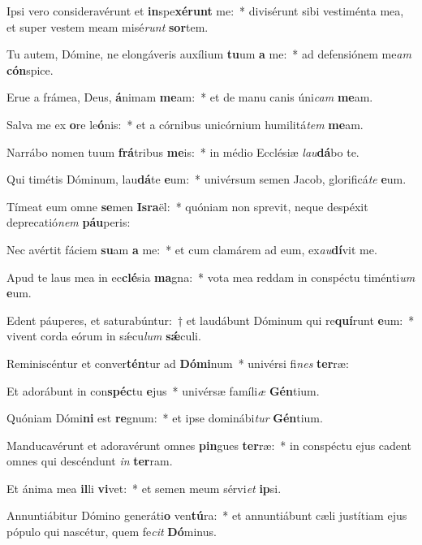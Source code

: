 \item Ipsi vero consideravérunt et \textbf{in}spe\textbf{xé}\textbf{runt} me:~* divisérunt sibi vestiménta mea, et super vestem meam misé\textit{runt} \textbf{sor}tem.
\item Tu autem, Dómine, ne elongáveris auxílium \textbf{tu}um \textbf{a} me:~* ad defensiónem me\textit{am} \textbf{cón}spice.
\item Erue a frámea, Deus, \textbf{á}nimam \textbf{me}am:~* et de manu canis úni\textit{cam} \textbf{me}am.
\item Salva me ex \textbf{o}re le\textbf{ó}nis:~* et a córnibus unicórnium humilitá\textit{tem} \textbf{me}am.
\item Narrábo nomen tuum \textbf{frá}tribus \textbf{me}is:~* in médio Ecclésiæ \textit{lau}\textbf{dá}bo te.
\item Qui timétis Dóminum, lau\textbf{dá}te \textbf{e}um:~* univérsum semen Jacob, glorificá\textit{te} \textbf{e}um.
\item Tímeat eum omne \textbf{se}men \textbf{Is}\textbf{ra}ël:~* quóniam non sprevit, neque despéxit deprecatió\textit{nem} \textbf{páu}peris:
\item Nec avértit fáciem \textbf{su}am \textbf{a} me:~* et cum clamárem ad eum, ex\textit{au}\textbf{dí}vit me.
\item Apud te laus mea in ec\textbf{clé}sia \textbf{ma}gna:~* vota mea reddam in conspéctu timénti\textit{um} \textbf{e}um.
\item Edent páuperes, et saturabúntur:~† et laudábunt Dóminum qui re\textbf{quí}runt \textbf{e}um:~* vivent corda eórum in sǽcu\textit{lum} \textbf{sǽ}culi.
\item Reminiscéntur et conver\textbf{tén}tur ad \textbf{Dó}\textbf{mi}num~* univérsi fi\textit{nes} \textbf{ter}ræ:
\item Et adorábunt in con\textbf{spéc}tu \textbf{e}jus~* univérsæ famíli\textit{æ} \textbf{Gén}tium.
\item Quóniam Dómi\textbf{ni} est \textbf{re}gnum:~* et ipse dominábi\textit{tur} \textbf{Gén}tium.
\item Manducavérunt et adoravérunt omnes \textbf{pin}gues \textbf{ter}ræ:~* in conspéctu ejus cadent omnes qui descéndunt \textit{in} \textbf{ter}ram.
\item Et ánima mea \textbf{il}li \textbf{vi}vet:~* et semen meum sérvi\textit{et} \textbf{ip}si.
\item Annuntiábitur Dómino generáti\textbf{o} ven\textbf{tú}ra:~* et annuntiábunt cæli justítiam ejus pópulo qui nascétur, quem fe\textit{cit} \textbf{Dó}minus.
